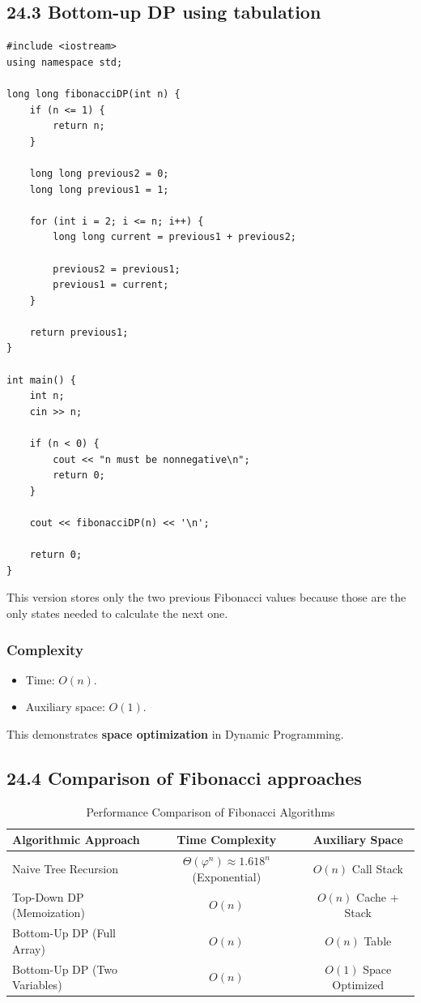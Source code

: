 \subsection{24.3 Bottom-up DP using tabulation}

\begin{lstlisting}[style=cppstyle]
#include <iostream>
using namespace std;

long long fibonacciDP(int n) {
    if (n <= 1) {
        return n;
    }

    long long previous2 = 0;
    long long previous1 = 1;

    for (int i = 2; i <= n; i++) {
        long long current = previous1 + previous2;

        previous2 = previous1;
        previous1 = current;
    }

    return previous1;
}

int main() {
    int n;
    cin >> n;

    if (n < 0) {
        cout << "n must be nonnegative\n";
        return 0;
    }

    cout << fibonacciDP(n) << '\n';

    return 0;
}
\end{lstlisting}

This version stores only the two previous Fibonacci values because those are the only states needed to calculate the next one.

\subsubsection{Complexity}

\begin{itemize}
    \item Time: $O(n)$.
    \item Auxiliary space: $O(1)$.
\end{itemize}

This demonstrates \textbf{space optimization} in Dynamic Programming.

\subsection{24.4 Comparison of Fibonacci approaches}

\begin{table}[htbp]
\centering
\caption{Performance Comparison of Fibonacci Algorithms}
\label{tab:fibonacci_comparison}
\begin{tabularx}{\textwidth}{p{5.5cm} c c}
\toprule
\textbf{Algorithmic Approach} & \textbf{Time Complexity} & \textbf{Auxiliary Space} \\
\midrule
Naive Tree Recursion & $\Theta(\varphi^n) \approx 1.618^n$ (Exponential) & $O(n)$ Call Stack \\
Top-Down DP (Memoization) & $O(n)$ & $O(n)$ Cache + Stack \\
Bottom-Up DP (Full Array) & $O(n)$ & $O(n)$ Table \\
Bottom-Up DP (Two Variables) & $O(n)$ & $O(1)$ Space Optimized \\
\bottomrule
\end{tabularx}
\end{table}

